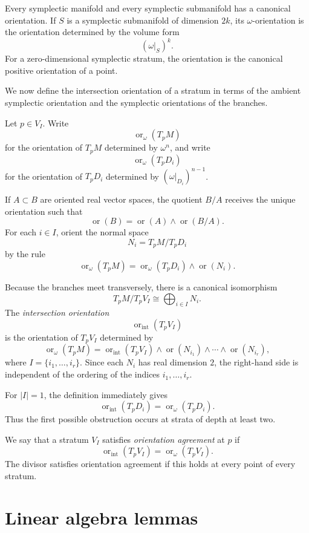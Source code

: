 \documentclass[12pt]{article}
\begin{document}
Every symplectic manifold and every symplectic submanifold has a canonical orientation. If \(S\) is a symplectic submanifold of dimension \(2k\), its \(\omega\)-orientation is the orientation determined by the volume form
\[
(\omega|_S)^k.
\]
For a zero-dimensional symplectic stratum, the orientation is the canonical positive orientation of a point.

We now define the intersection orientation of a stratum in terms of the ambient symplectic orientation and the symplectic orientations of the branches.

Let \(p\in V_I\). Write
\[
\operatorname{or}_\omega(T_pM)
\]
for the orientation of \(T_pM\) determined by \(\omega^n\), and write
\[
\operatorname{or}_\omega(T_pD_i)
\]
for the orientation of \(T_pD_i\) determined by \((\omega|_{D_i})^{n-1}\).

If \(A\subset B\) are oriented real vector spaces, the quotient \(B/A\) receives the unique orientation such that
\[
\operatorname{or}(B)=\operatorname{or}(A)\wedge \operatorname{or}(B/A).
\]
For each \(i\in I\), orient the normal space
\[
N_i=T_pM/T_pD_i
\]
by the rule
\[
\operatorname{or}_\omega(T_pM)
=
\operatorname{or}_\omega(T_pD_i)\wedge \operatorname{or}(N_i).
\]

Because the branches meet transversely, there is a canonical isomorphism
\[
T_pM/T_pV_I \cong \bigoplus_{i\in I} N_i.
\]
The \emph{intersection orientation}
\[
\operatorname{or}_{\mathrm{int}}(T_pV_I)
\]
is the orientation of \(T_pV_I\) determined by
\begin{equation}\label{eq:intersection-orientation}
\operatorname{or}_\omega(T_pM)
=
\operatorname{or}_{\mathrm{int}}(T_pV_I)
\wedge
\operatorname{or}(N_{i_1})
\wedge\cdots\wedge
\operatorname{or}(N_{i_r}),
\end{equation}
where \(I=\{i_1,\dots,i_r\}\). Since each \(N_i\) has real dimension \(2\), the right-hand side is independent of the ordering of the indices \(i_1,\dots,i_r\).

For \(|I|=1\), the definition immediately gives
\[
\operatorname{or}_{\mathrm{int}}(T_pD_i)=\operatorname{or}_\omega(T_pD_i).
\]
Thus the first possible obstruction occurs at strata of depth at least two.

We say that a stratum \(V_I\) satisfies \emph{orientation agreement} at \(p\) if
\[
\operatorname{or}_{\mathrm{int}}(T_pV_I)
=
\operatorname{or}_\omega(T_pV_I).
\]
The divisor satisfies orientation agreement if this holds at every point of every stratum.

\section{Linear algebra lemmas}
\end{document}
